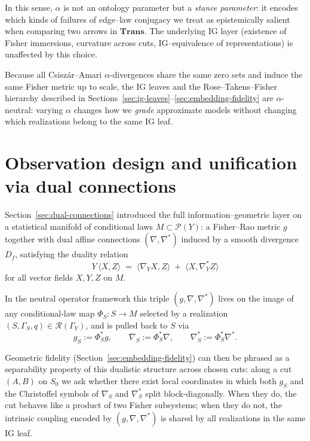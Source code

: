 \documentclass[11pt]{article}
\newcommand{\1}{\mathbf{1}}
\begin{document}
In this sense, \(\alpha\) is not an ontology parameter but a \emph{stance parameter}: it encodes which kinds of failures of edge–law conjugacy we treat as epistemically salient when comparing two arrows in \(\mathbf{Trans}\). The underlying IG layer (existence of Fisher immersions, curvature across cuts, IG–equivalence of representations) is unaffected by this choice.

Because all Csiszár--Amari $\alpha$-divergences share the same zero sets and induce the same Fisher metric up to scale, the IG leaves and the Rose--Takens--Fisher hierarchy described in Sections~\ref{sec:ig-leaves}--\ref{sec:embedding-fidelity} are $\alpha$-neutral: varying $\alpha$ changes how we \emph{grade} approximate models without changing which realizations belong to the same IG leaf.

\section{Observation design and unification via dual connections}
\label{sec:neutral-dual-connections}

Section~\ref{sec:dual-connections} introduced the full information–geometric
layer on a statistical manifold of conditional laws $M \subset \mathcal P(Y)$:
a Fisher–Rao metric $g$ together with dual affine connections
$(\nabla,\nabla^\ast)$ induced by a smooth divergence $D_f$, satisfying the
duality relation
\[
  Y \,\langle X, Z \rangle
  \;=\;
  \langle \nabla_Y X, Z \rangle
  \;+\;
  \langle X, \nabla^\ast_Y Z \rangle
\]
for all vector fields $X,Y,Z$ on $M$.

In the neutral operator framework this triple $(g,\nabla,\nabla^\ast)$ lives on
the image of any conditional-law map $\Phi_S : S \to M$ selected by a realization
$(S,\Gamma_S,q) \in \mathcal R(\Gamma_Y)$, and is pulled back to $S$ via
\[
  g_S := \Phi_S^\ast g, \qquad
  \nabla_S := \Phi_S^\ast \nabla, \qquad
  \nabla_S^\ast := \Phi_S^\ast \nabla^\ast.
\]

Geometric fidelity (Section~\ref{sec:embedding-fidelity}) can then be phrased as
a separability property of this dualistic structure across chosen cuts: along a
cut $(A,B)$ on $S_0$ we ask whether there exist local coordinates in which both
$g_S$ and the Christoffel symbols of $\nabla_S$ and $\nabla_S^\ast$ split
block-diagonally. When they do, the cut behaves like a product of two Fisher
subsystems; when they do not, the intrinsic coupling encoded by
$(g,\nabla,\nabla^\ast)$ is shared by all realizations in the same IG leaf.
\end{document}
